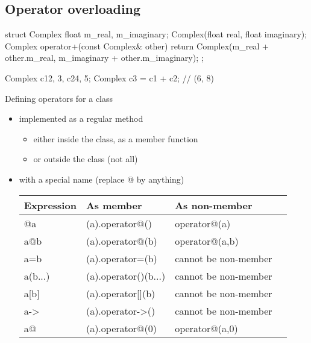 \subsection[Op]{Operator overloading}

\begin{frame}[fragile]
  \begin{cppcode}
    struct Complex {
      float m_real, m_imaginary;
      Complex(float real, float imaginary);
      Complex operator+(const Complex& other) {
        return Complex(m_real + other.m_real,
                       m_imaginary + other.m_imaginary);
      }
    };

    Complex c1{2, 3}, c2{4, 5};
    Complex c3 = c1 + c2; // (6, 8)
  \end{cppcode}
\end{frame}

\begin{frame}
  \begin{block}{Defining operators for a class}
    \begin{itemize}
    \item implemented as a regular method
      \begin{itemize}
      \item either inside the class, as a member function
      \item or outside the class (not all)
      \end{itemize}
    \item with a special name (replace @ by anything)
      \begin{tabular}{llll}
        Expression & As member & As non-member \\
        \hline
        @a & (a).operator@() & operator@(a) \\
        a@b & (a).operator@(b) & operator@(a,b) \\
        a=b & (a).operator=(b) & cannot be non-member \\
        a(b...) & (a).operator()(b...) & cannot be non-member \\
        a[b] & (a).operator[](b) & cannot be non-member \\
        a-\textgreater & (a).operator-\textgreater() & cannot be non-member \\
        a@ & (a).operator@(0) & operator@(a,0) \\
      \end{tabular}
    \end{itemize}
  \end{block}
\end{frame}

